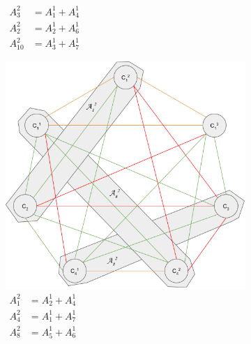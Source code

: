 \begin{figure}
\begin{subfigure}[b]{\sfwidth}
    \caption[caption]{$\begin{aligned}
              A_3^2    &= A_1^1 + A_4^1\\
              A_2^2    &= A_2^1 + A_6^1\\
              A_{10}^2 &= A_3^1 + A_7^1
            \end{aligned}$}
  \end{subfigure}
  \begin{subfigure}[b]{\sfwidth}
    \includegraphics[width=\textwidth]{img/split-2-class_2.png}
    \caption[caption]{$\begin{aligned}
              A_1^2 &= A_2^1 + A_4^1\\
              A_4^2 &= A_1^1 + A_7^1\\
              A_8^2 &= A_5^1 + A_6^1
             \end{aligned}$}
  \end{subfigure}
  \begin{subfigure}[b]{\sfwidth}

\end{subfigure}
\end{figure}
